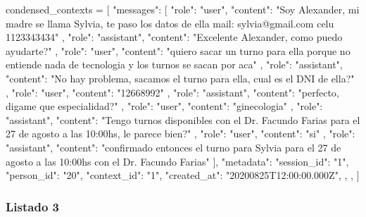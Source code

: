 \begin{APACode}
condensed_contexts = [
    {
        "messages": [
            {
                "role": "user",
                "content": "Soy Alexander, mi madre se llama Sylvia, te paso los datos de ella mail: sylvia@gmail.com celu 1123343434"
            },
            {
                "role": "assistant",
                "content": "Excelente Alexander, como puedo ayudarte?"
            },
            {
                "role": "user",
                "content": "quiero sacar un turno para ella porque no entiende nada de tecnologia y los turnos se sacan por aca"
            },
            {
                "role": "assistant",
                "content": "No hay problema, sacamos el turno para ella, cual es el DNI de ella?"
            },
            {
                "role": "user", 
                "content": "12668992"
            },
            {
                "role": "assistant",
                "content": "perfecto, digame que especialidad?"
            },
            {
                "role": "user", 
                "content": "ginecologia"
            },
            {
                "role": "assistant",
                "content": "Tengo turnos disponibles con el Dr. Facundo Farias para el 27 de agosto a las 10:00hs, le parece bien?"
            },
            {
                "role": "user",
                "content": "si"
            },
            {
                "role": "assistant",
                "content": "confirmado entonces el turno para Sylvia para el 27 de agosto a las 10:00hs con el Dr. Facundo Farias"
            }
        ],
        "metadata": { 
            "session_id": "1",
            "person_id": "20",
            "context_id": "1",
            "created_at": "20200825T12:00:00.000Z",
        },
    },
]
\end{APACode}

\subsubsection{Listado 3}
\label{anexo:code-4-1-16-3}

